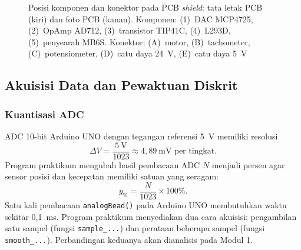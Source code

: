 \documentclass[11pt,a4paper]{article}
\begin{document}
\begin{figure}[H]
\begin{minipage}{0.47\textwidth}
	\end{minipage}
	\caption{Posisi komponen dan konektor pada PCB \textit{shield}: tata letak PCB (kiri) dan foto PCB (kanan). Komponen: (1)~DAC MCP4725, (2)~OpAmp AD712, (3)~transistor TIP41C, (4)~L293D, (5)~penyearah MB6S. Konektor: (A)~motor, (B)~tachometer, (C)~potensiometer, (D)~catu daya 24~V, (E)~catu daya 5~V}
	\label{fig:konektor_pcb}
\end{figure}

\subsection{Akuisisi Data dan Pewaktuan Diskrit}

\subsubsection{Kuantisasi ADC}
ADC 10-bit Arduino UNO dengan tegangan referensi 5~V memiliki resolusi
\begin{equation}
	\Delta V = \frac{5~\text{V}}{1023} \approx 4{,}89~\text{mV per tingkat}.
	\label{eq:resolusi_adc}
\end{equation}
Program praktikum mengubah hasil pembacaan ADC $N$ menjadi persen agar sensor posisi dan kecepatan memiliki satuan yang seragam:
\begin{equation}
	y_{\%} = \frac{N}{1023} \times 100\%.
	\label{eq:adc_persen}
\end{equation}
Satu kali pembacaan \texttt{analogRead()} pada Arduino UNO membutuhkan waktu sekitar 0,1~ms. Program praktikum menyediakan dua cara akuisisi: pengambilan satu sampel (fungsi \texttt{sample\_...}) dan perataan beberapa sampel (fungsi \texttt{smooth\_...}). Perbandingan keduanya akan dianalisis pada Modul 1.
\end{document}
